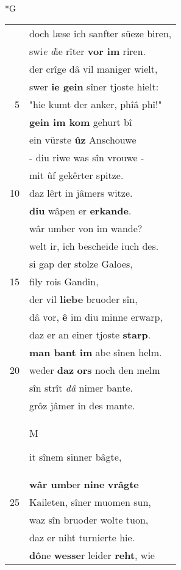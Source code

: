 \documentclass[8pt,a4paper,notitlepage]{article}
\begin{document}
\begin{table}[ht]
\begin{minipage}[t]{0.5\linewidth}
\small
\begin{center}*G
\end{center}
\begin{tabular}{rl}
 & doch læse ich sanfter süeze biren,\\ 
 & swi\textit{e} \textit{d}ie rîter \textbf{vor im} riren.\\ 
 & der crîge dâ vil maniger wielt,\\ 
 & swer \textbf{ie gein} sîner tjoste hielt:\\ 
5 & "hie kumt der anker, phîâ phî!"\\ 
 & \textbf{gein im kom} gehurt bî\\ 
 & ein vürste \textbf{ûz} Anschouwe\\ 
 & - diu riwe was sîn vrouwe -\\ 
 & mit ûf gekêrter spitze.\\ 
10 & daz lêrt in jâmers witze.\\ 
 & \textbf{diu} wâpen er \textbf{erkande}.\\ 
 & wâr umber von im wande?\\ 
 & welt ir, ich bescheide iuch des.\\ 
 & si gap der stolze Galoes,\\ 
15 & fily rois Gandin,\\ 
 & der vil \textbf{liebe} bruoder sîn,\\ 
 & dâ vor, \textbf{ê} im diu minne erwarp,\\ 
 & daz er an einer tjoste \textbf{starp}.\\ 
 & \textbf{man bant im} abe sînen helm.\\ 
20 & weder \textbf{daz} \textbf{ors} noch den melm\\ 
 & sîn strît \textit{dâ} nimer bante.\\ 
 & grôz jâmer in des mante.\\ 
 & \begin{large}M\end{large}it sînem sinner bâgte,\\ 
 & \textbf{wâr umb}er \textbf{nine} \textbf{vrâgte}\\ 
25 & Kaileten, sîner muomen sun,\\ 
 & waz sîn bruoder wolte tuon,\\ 
 & daz er niht turnierte hie.\\ 
 & \textbf{dô}ne \textbf{wesse}r leider \textbf{reht}, wie\\ 

\end{tabular}
\end{minipage}
\end{table}
\end{document}
